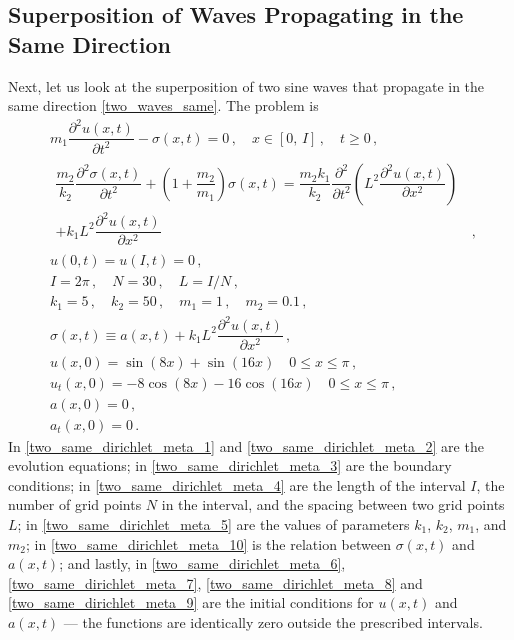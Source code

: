 \documentclass[11pt,a4paper,oneside,openright]{report} %
\begin{document}
\subsection{Superposition of Waves Propagating in the Same Direction}
\noindent
Next, let us look at the superposition of two sine waves that propagate in the same direction \eqref{two_waves_same}. The problem is
\begin{subequations}\label{}
    \begin{align}
        & m_1 \dfrac{\partial^2 u(x,t)}{\partial t^2} - \sigma(x,t)  = 0 \, , \quad x \in \left[0, \, I \right] \, , \quad t \geq 0 \, , \label{two_same_dirichlet_meta_1} \\[5pt]
        & \begin{aligned}
            \dfrac{m_2}{k_2} \dfrac{\partial^2 \sigma(x,t)}{\partial t^2}  + \left(1 + \dfrac{m_2}{m_1} \right) \sigma(x,t) = \dfrac{m_2 k_1}{k_2} \dfrac{\partial^2 }{\partial t^2 } \left(L^2 \dfrac{\partial^2 u(x,t)}{\partial x^2} \right) & \\ + k_1 L^2 \dfrac{\partial^2 u(x,t)}{\partial x^2} & \, ,
        \end{aligned} \label{two_same_dirichlet_meta_2} \\[5pt]
        & u(0, t) = u(I, t) = 0 \, , \label{two_same_dirichlet_meta_3} \\[5pt]
        & I = 2\pi \, , \quad N = 30 \, , \quad L = I/N \, , \label{two_same_dirichlet_meta_4} \\[5pt]
        & k_1 = 5 \, , \quad k_2 = 50 \, , \quad m_1 = 1 \, , \quad m_2 = 0.1 \, , \label{two_same_dirichlet_meta_5} \\[5pt]
        & \sigma(x,t) \equiv a(x,t) + k_1 L^2 \dfrac{\partial^2 u(x,t)}{\partial x^2} \, , \label{two_same_dirichlet_meta_10} \\[5pt]
        & u(x,0) = \sin{(8 x)} + \sin{(16 x)} \quad 0 \leq x \leq \pi \, , \label{two_same_dirichlet_meta_6} \\[5pt]
        & u_t(x,0) = - 8 \cos(8 x) - 16 \cos(16 x)  \quad 0 \leq x \leq \pi \, , \label{two_same_dirichlet_meta_7} \\[5pt]
        & a(x,0) = 0 \, , \label{two_same_dirichlet_meta_8} \\[5pt]
        & a_t(x,0) = 0 \, . \label{two_same_dirichlet_meta_9}
    \end{align}
\end{subequations}
In \eqref{two_same_dirichlet_meta_1} and \eqref{two_same_dirichlet_meta_2} are the evolution equations; in \eqref{two_same_dirichlet_meta_3} are the boundary conditions; in \eqref{two_same_dirichlet_meta_4} are the length of the interval $I$, the number of grid points $N$ in the interval, and the spacing between two grid points $L$; in \eqref{two_same_dirichlet_meta_5} are the values of parameters $k_1$, $k_2$, $m_1$, and $m_2$; in \eqref{two_same_dirichlet_meta_10} is the relation between $\sigma(x,t)$ and $a(x,t)$; and lastly, in \eqref{two_same_dirichlet_meta_6}, \eqref{two_same_dirichlet_meta_7}, \eqref{two_same_dirichlet_meta_8} and \eqref{two_same_dirichlet_meta_9} are the initial conditions for $u(x,t)$ and~$a(x,t)$ — the functions are identically zero outside the prescribed intervals.
\end{document}
